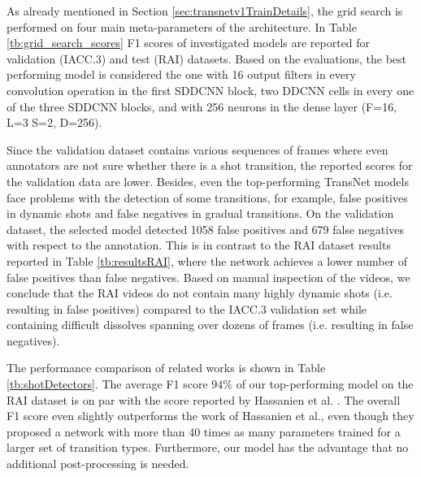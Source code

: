 As already mentioned in Section \ref{sec:transnetv1TrainDetails}, the grid search is performed on four main meta-parameters of the architecture. In Table \ref{tb:grid_search_scores} F1 scores of investigated models are reported for validation (IACC.3) and test (RAI) datasets. Based on the evaluations, the best performing model is considered the one with 16 output filters in every convolution operation in the first SDDCNN block, two DDCNN cells in every one of the three SDDCNN blocks, and with 256 neurons in the dense layer (F=16, L=3 S=2, D=256).

Since the validation dataset contains various sequences of frames where even annotators are not sure whether there is a shot transition, the reported scores for the validation data are lower. Besides, even the top-performing TransNet models face problems with the detection of some transitions, for example, false positives in dynamic shots and false negatives in gradual transitions.
On the validation dataset, the selected model detected 1058 false positives and 679 false negatives with respect to the annotation. This is in contrast to the RAI dataset results reported in Table \ref{tb:resultsRAI}, where the network achieves a lower number of false positives than false negatives. Based on manual inspection of the videos, we conclude that the RAI videos do not contain many highly dynamic shots (i.e. resulting in false positives) compared to the IACC.3 validation set while containing difficult dissolves spanning over dozens of frames (i.e. resulting in false negatives).

The performance comparison of related works is shown in Table \ref{tb:shotDetectors}. The average F1 score $94\%$ of our top-performing model on the RAI dataset is on par with the score reported by Hassanien et al. \cite{Hassanien17}. The overall F1 score even slightly outperforms the work of Hassanien et al., even though they proposed a network with more than 40 times as many parameters trained for a larger set of transition types. Furthermore, our model has the advantage that no additional post-processing is needed.

